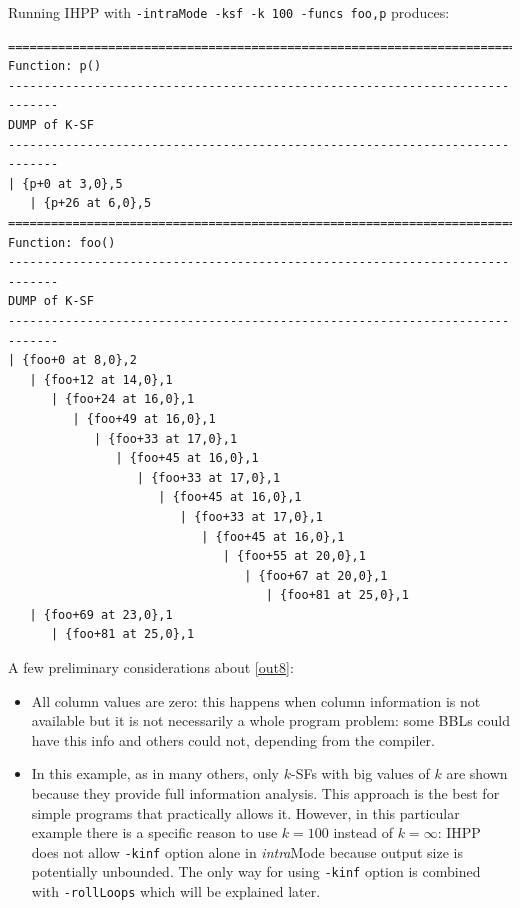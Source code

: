 \documentclass[a4paper,10pt]{report}
\begin{document}
\noindent
Running IHPP with \verb|-intraMode -ksf -k 100 -funcs foo,p| produces:

\begin{lstlisting}[label=out8, caption={IHPP partial output for \texttt{prog4}},frame=bottomline]
=============================================================================
Function: p()
-----------------------------------------------------------------------------
DUMP of K-SF
-----------------------------------------------------------------------------
| {p+0 at 3,0},5
   | {p+26 at 6,0},5
=============================================================================
Function: foo()
-----------------------------------------------------------------------------
DUMP of K-SF
-----------------------------------------------------------------------------
| {foo+0 at 8,0},2
   | {foo+12 at 14,0},1
      | {foo+24 at 16,0},1
         | {foo+49 at 16,0},1
            | {foo+33 at 17,0},1
               | {foo+45 at 16,0},1
                  | {foo+33 at 17,0},1
                     | {foo+45 at 16,0},1
                        | {foo+33 at 17,0},1
                           | {foo+45 at 16,0},1
                              | {foo+55 at 20,0},1
                                 | {foo+67 at 20,0},1
                                    | {foo+81 at 25,0},1
   | {foo+69 at 23,0},1
      | {foo+81 at 25,0},1

\end{lstlisting}

\noindent
A few preliminary considerations about \cref{out8}:
\renewcommand{\labelitemi}{$-$}

\begin{itemize}
\item All column values are zero: this happens when 
column information is not available but it is not necessarily a whole program 
problem: some BBLs could have this info and others could not, depending from the compiler.
\item In this example, as in many others, only $k$-SFs with big values of $k$
are shown because they provide full information analysis. This approach is the best for 
simple programs that practically allows it. 
However, in this particular example there is a specific reason to use $k=100$ instead of $k=\infty$: IHPP does not allow \verb|-kinf| option alone in \emph{intra}Mode because
output size is potentially unbounded. The only way for using \verb|-kinf| option is combined with \verb|-rollLoops| which will be explained later.
\end{itemize}
\renewcommand{\labelitemi}{$\bullet$}
\end{document}
